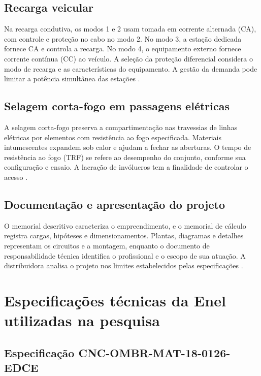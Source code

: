 \subsection{Recarga veicular}

Na recarga condutiva, os modos 1 e 2 usam tomada em corrente alternada (CA), com controle e proteção no cabo no modo 2. No modo 3, a estação dedicada fornece CA e controla a recarga. No modo 4, o equipamento externo fornece corrente contínua (CC) ao veículo. A seleção da proteção diferencial considera o modo de recarga e as características do equipamento. A gestão da demanda pode limitar a potência simultânea das estações \cite[itens~7.1.5--7.1.7 e Tabela~3]{enel0280}.

\subsection{Selagem corta-fogo em passagens elétricas}

A selagem corta-fogo preserva a compartimentação nas travessias de linhas elétricas por elementos com resistência ao fogo especificada. Materiais intumescentes expandem sob calor e ajudam a fechar as aberturas. O tempo de resistência ao fogo (TRF) se refere ao desempenho do conjunto, conforme sua configuração e ensaio. A lacração de invólucros tem a finalidade de controlar o acesso \cite[item~6.2.9.6]{abnt5410}\cite[item~7.22.9]{enel1580}.

\subsection{Documentação e apresentação do projeto}

O memorial descritivo caracteriza o empreendimento, e o memorial de cálculo registra cargas, hipóteses e dimensionamentos. Plantas, diagramas e detalhes representam os circuitos e a montagem, enquanto o documento de responsabilidade técnica identifica o profissional e o escopo de sua atuação. A distribuidora analisa o projeto nos limites estabelecidos pelas especificações \cite[seção~7.12]{enel0126}\cite[seções~7.2--7.3]{enel1580}.

\section{Especificações técnicas da Enel utilizadas na pesquisa}
\label{sec:especificacoes}

\subsection{Especificação CNC-OMBR-MAT-18-0126-EDCE}
\label{subsec:0126}

